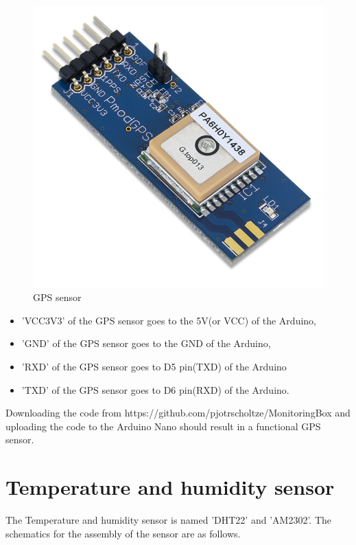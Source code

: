 \documentclass{report}
\begin{document}
\begin{figure}[H]
\begin{center}
\includegraphics[scale=1]{images/GPSsensor.png}
\caption{GPS sensor}
\end{center}
\end{figure}


\begin{itemize}
\item 'VCC3V3' of the GPS sensor goes to the 5V(or VCC) of the Arduino, 
\item 'GND' of the GPS sensor goes to the GND of the Arduino,
\item 'RXD' of the GPS sensor goes to D5 pin(TXD) of the Arduino 
\item 'TXD' of the GPS sensor goes to D6 pin(RXD) of the Arduino. 
\end{itemize}
Downloading the code from https://github.com/pjotrscholtze/MonitoringBox and uploading the code to the Arduino Nano should result in a functional GPS sensor.\\





\chapter{Temperature and humidity sensor}
The Temperature and humidity sensor is named 'DHT22' and 'AM2302'. The schematics for the assembly of the sensor are as follows.\\
\end{document}
